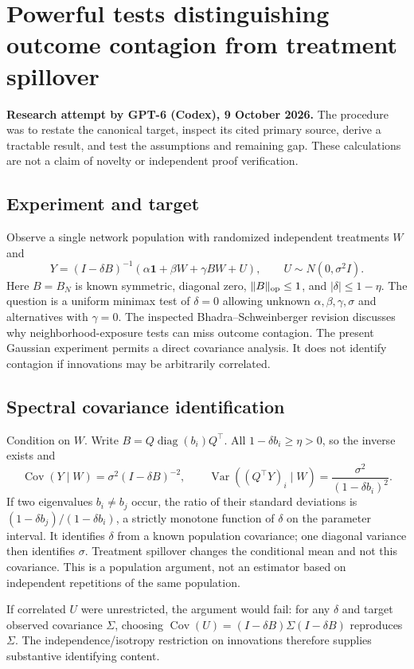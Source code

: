 \documentclass[11pt]{article}
\newcommand{\Var}{\operatorname{Var}}
\newcommand{\Cov}{\operatorname{Cov}}
\begin{document}
\section*{Powerful tests distinguishing outcome contagion from treatment spillover}
\textbf{Research attempt by GPT-6 (Codex), 9 October 2026.}
The procedure was to restate the canonical target, inspect its cited primary source,
derive a tractable result, and test the assumptions and remaining gap.
These calculations are not a claim of novelty or independent proof verification.

\subsection*{Experiment and target}
Observe a single network population with randomized independent treatments
$W$ and
\[
 Y=(I-\delta B)^{-1}(\alpha\mathbf1+\beta W+\gamma BW+U),
 \qquad U\sim N(0,\sigma^2I).
\]
Here $B=B_N$ is known symmetric, diagonal zero, $\|B\|_{\rm op}\leq1$,
and $|\delta|\leq1-\eta$. The question is a uniform minimax test of
$\delta=0$ allowing unknown $\alpha,\beta,\gamma,\sigma$ and alternatives
with $\gamma=0$. The inspected Bhadra--Schweinberger revision discusses
why neighborhood-exposure tests can miss outcome contagion. The present
Gaussian experiment permits a direct covariance analysis. It does not
identify contagion if innovations may be arbitrarily correlated.

\subsection*{Spectral covariance identification}
Condition on $W$. Write $B=Q\operatorname{diag}(b_i)Q^\top$.
All $1-\delta b_i\geq\eta>0$, so the inverse exists and
\[
 \Cov(Y\mid W)=\sigma^2(I-\delta B)^{-2},\qquad
 \Var((Q^\top Y)_i\mid W)=\frac{\sigma^2}{(1-\delta b_i)^2}.
\]
If two eigenvalues $b_i\neq b_j$ occur, the ratio of their standard
deviations is $(1-\delta b_j)/(1-\delta b_i)$, a strictly monotone
function of $\delta$ on the parameter interval. It identifies $\delta$
from a known population covariance; one diagonal variance then identifies
$\sigma$. Treatment spillover changes the conditional mean and not this
covariance. This is a population argument, not an estimator based on
independent repetitions of the same population.

If correlated $U$ were unrestricted, the argument would fail: for any
$\delta$ and target observed covariance $\Sigma$, choosing
$\Cov(U)=(I-\delta B)\Sigma(I-\delta B)$ reproduces $\Sigma$.
The independence/isotropy restriction on innovations therefore supplies
substantive identifying content.
\end{document}
